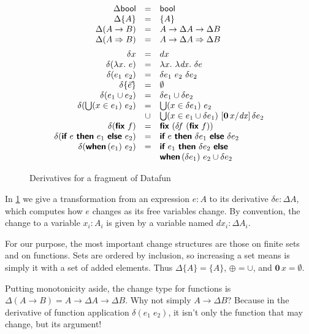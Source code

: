 \documentclass[sigplan,screen,review,timestamp,dvipsnames]{acmart}
\newcommand{\D}{\Delta}
\newcommand{\fn}{\lambda}
\newcommand{\binder}{.~}
\newcommand{\bind}[1]{#1\binder}
\newcommand{\fnof}[1]{\fn\bind{#1}}
\renewcommand{\d}{\delta}
\newcommand{\zero}{\mathbf{0}}
\newcommand{\kw}[1]{\textsf{\bfseries #1}}
\newcommand{\var}[1]{\mathit{#1}}
\newcommand{\dee}[1]{\var{d#1}}
\newcommand{\subst}[1]{[#1]\,}
\newcommand{\mto}{\overset{+}{\to}}
\renewcommand{\mto}{\Rightarrow}
\newcommand{\tset}[1]{\{#1\}}
\newcommand{\tbool}{\textsf{bool}}
\newcommand{\eset}[1]{\{#1\}}
\newcommand{\ewhen}[1]{\kw{when}\,(#1)~}
\newcommand{\eif}[2]{\kw{if}~#1~\kw{then}~#2~\kw{else}~}
\newcommand{\efor}[1]{\bigcup(#1)~}
\newcommand{\elet}[1]{\kw{let}~#1~\kw{in}~}
\newcommand{\efix}{\kw{fix}~}
\begin{document}
\begin{figure}
  \[\begin{array}{rcl}
    \D\tbool &=& \tbool\\
    \D\tset{A} &=& \tset{A}\\
    \D(A \to B) &=& A \to \D A \to \D B\\
    \D(A \mto B) &=& A \to \D A \mto \D B
    \vspace{0.5em}\\
    \d x &=& dx\\
    \d(\fnof x e) &=& \fnof x \fnof{\dee x} \d{e}\\
    \d(e_1~e_2) &=& \d{e_1}~e_2~\d{e_2}\\
    \d{\eset{\vec e}} &=& \emptyset\\
    \d(e_1 \cup e_2) &=& \d{e_1} \cup \d{e_2}\\
    \d(\efor{x \in e_1} e_2)
    &=& \efor{x \in \d{e_1}} e_2\\
    &\cup& \efor{x \in e_1 \cup \d{e_1}}
    \subst{\zero\, x / \dee x}
    \d{e_2}
    \\
    \d(\efix f) &=& \efix (\d\!f~(\efix f))\\
    \d(\eif{e}{e_1}{e_2}) &=& \eif{e}{\d{e_1}}{\d{e_2}}\\
    \d(\ewhen{e_1}{e_2})
    &=& \eif{e_1}{\d{e_2}}\\
    && \ewhen{\d{e_1}} {e_2 \cup \d{e_2}}
  \end{array}\]
  \vspace{-.8em}
  \caption{Derivatives for a fragment of Datafun}
  \label{fig:derivatives}
\end{figure}

In \cref{fig:derivatives} we give a transformation from an expression $e : A$ to
its derivative $\d e : \D A$, which computes how $e$ changes as its free
variables change. By convention, the change to a variable $x_i : A_i$ is given
by a variable named $\dee x_i : \D A_i$.

For our purpose, the most important change structures are those on finite sets
and on functions. Sets are ordered by inclusion, so increasing a set means is
simply it with a set of added elements. Thus $\D\tset{A} = \tset{A}$, $\oplus =
\cup$, and $\zero\,x = \emptyset$.

Putting monotonicity aside, the change type for functions is $\D(A \to B) = A
\to \D A \to \D B$. Why not simply $A \to \D B$? Because in the derivative of
function application $\d(e_1\;e_2)$, it isn't only the function that may change,
but its argument!
\end{document}
